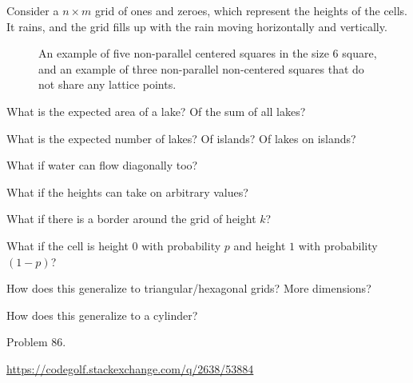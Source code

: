 \documentclass{article}
\begin{document}
  Consider a $n \times m$ grid of ones and zeroes, which represent the heights of the
  cells. It rains, and the grid fills up with the rain moving horizontally and
  vertically.
\begin{figure}[ht!]
  \centering
  \caption{
    An example of five non-parallel centered squares in the size 6 square, and
    an example of three non-parallel non-centered squares that do not share any
    lattice points.
  }
\end{figure}

\begin{question}
  What is the expected area of a lake? Of the sum of all lakes?
\end{question}

\begin{related}
  \item What is the expected number of lakes? Of islands? Of lakes on islands?
  \item What if water can flow diagonally too?
  \item What if the heights can take on arbitrary values?
  \item What if there is a border around the grid of height $k$?
  \item What if the cell is height $0$ with probability $p$ and height $1$ with probability $(1-p)$?
  \item How does this generalize to triangular/hexagonal grids? More dimensions?
  \item How does this generalize to a cylinder?
\end{related}

\begin{references}
  \item Problem 86.
  \item \url{https://codegolf.stackexchange.com/q/2638/53884}
\end{references}
\end{document}

